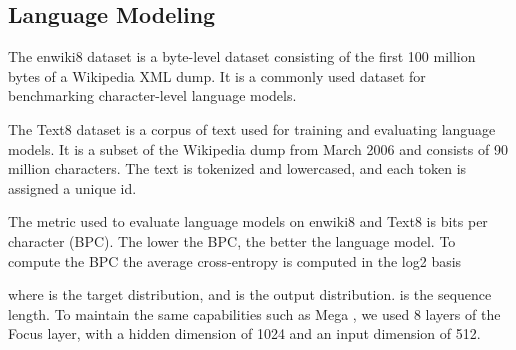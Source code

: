 \documentclass[11pt]{article}
\begin{document}
\subsection{Language Modeling}
The enwiki8 dataset is a byte-level dataset consisting of the first 100 million bytes of a Wikipedia XML dump. It is a commonly used dataset for benchmarking character-level language models. 

The Text8 dataset is a corpus of text used for training and evaluating language models. It is a subset of the Wikipedia dump from March 2006 and consists of 90 million characters. The text is tokenized and lowercased, and each token is assigned a unique id.




The metric used to evaluate language models on enwiki8 and Text8 is bits per character (BPC). The lower the BPC, the better the language model.
To compute the BPC the average cross-entropy is computed in the log2 basis

where  is the target distribution, and  is the output distribution.  is the sequence length.
To maintain the same capabilities such as Mega \cite{ma2022mega}, we used 8 layers of the Focus layer, with a hidden dimension of 1024 and an input dimension of 512. 
\end{document}
